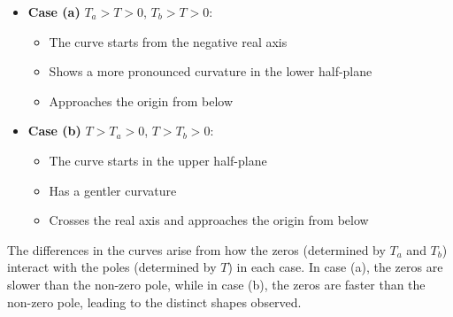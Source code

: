 \documentclass{article}
\begin{document}
\begin{itemize}
    \item \textbf{Case (a)} $T_a > T > 0$, $T_b > T > 0$:
    \begin{itemize}
        \item The curve starts from the negative real axis
        \item Shows a more pronounced curvature in the lower half-plane
        \item Approaches the origin from below
    \end{itemize}
    
    \item \textbf{Case (b)} $T > T_a > 0$, $T > T_b > 0$:
    \begin{itemize}
        \item The curve starts in the upper half-plane
        \item Has a gentler curvature
        \item Crosses the real axis and approaches the origin from below
    \end{itemize}
\end{itemize}

The differences in the curves arise from how the zeros (determined by $T_a$ and $T_b$) interact with the poles (determined by $T$) in each case. In case (a), the zeros are slower than the non-zero pole, while in case (b), the zeros are faster than the non-zero pole, leading to the distinct shapes observed.


\end{document}
